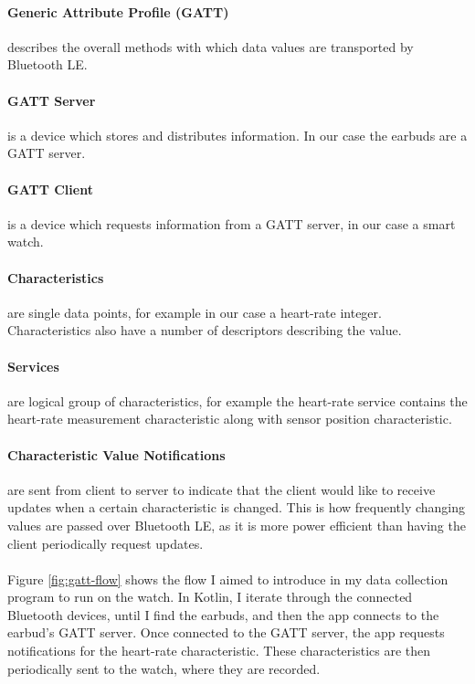 \documentclass[12pt,a4paper,twoside,openright]{report}
\begin{document}
\paragraph{Generic Attribute Profile (GATT)} describes the overall methods
with which data values are transported by Bluetooth LE.

\paragraph{GATT Server} is a device which stores and distributes information. In
our case the earbuds are a GATT server.

\paragraph{GATT Client} is a device which requests information from a GATT
server, in our case a smart watch.

\paragraph{Characteristics} are single data points, for example in our case a
heart-rate integer. Characteristics also have a number of descriptors
describing the value.

\paragraph{Services} are logical group of characteristics, for example the
heart-rate service contains the heart-rate measurement characteristic along
with sensor position characteristic.

\paragraph{Characteristic Value Notifications} are sent from client to server
to indicate that the client would like to receive updates when a certain
characteristic is changed. This is how frequently changing values are passed
over Bluetooth LE, as it is more power efficient than having the client
periodically request updates.
\\
\\

Figure \ref{fig:gatt-flow} shows the flow I aimed to introduce in my data collection program to run
on the watch. In Kotlin, I iterate through the connected Bluetooth devices,
until I find the earbuds, and then the app connects to the earbud's GATT
server. Once connected 
to the GATT server, the app
requests notifications for the heart-rate characteristic. These
characteristics are then periodically sent to the watch, where they are
recorded.
\end{document}
